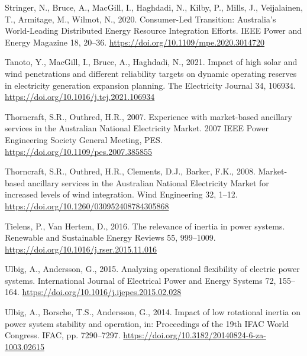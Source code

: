\documentclass[12pt,a4paper,]{report}
\newlength{\cslhangindent}
\newenvironment{CSLReferences}[2] %
 {%
  \setlength{\parindent}{0pt}
  \ifodd #1 \everypar{\setlength{\hangindent}{\cslhangindent}}\ignorespaces\fi
  \ifnum #2 > 0
  \setlength{\parskip}{#2\baselineskip}
  \fi
 }%
 {}
\begin{document}
\begin{CSLReferences}{1}{0}
\leavevmode{}%
Stringer, N., Bruce, A., MacGill, I., Haghdadi, N., Kilby, P., Mills,
J., Veijalainen, T., Armitage, M., Wilmot, N., 2020. Consumer-{Led
Transition}: {Australia}'s {World-Leading Distributed Energy Resource
Integration Efforts}. IEEE Power and Energy Magazine 18, 20--36.
\url{https://doi.org/10.1109/mpe.2020.3014720}

\leavevmode{}%
Tanoto, Y., MacGill, I., Bruce, A., Haghdadi, N., 2021. Impact of high
solar and wind penetrations and different reliability targets on dynamic
operating reserves in electricity generation expansion planning. The
Electricity Journal 34, 106934.
\url{https://doi.org/10.1016/j.tej.2021.106934}

\leavevmode{}%
Thorncraft, S.R., Outhred, H.R., 2007. Experience with market-based
ancillary services in the {Australian National Electricity Market}. 2007
IEEE Power Engineering Society General Meeting, PES.
\url{https://doi.org/10.1109/pes.2007.385855}

\leavevmode{}%
Thorncraft, S.R., Outhred, H.R., Clements, D.J., Barker, F.K., 2008.
Market-based ancillary services in the {Australian National Electricity
Market} for increased levels of wind integration. Wind Engineering 32,
1--12. \url{https://doi.org/10.1260/030952408784305868}

\leavevmode{}%
Tielens, P., Van Hertem, D., 2016. The relevance of inertia in power
systems. Renewable and Sustainable Energy Reviews 55, 999--1009.
\url{https://doi.org/10.1016/j.rser.2015.11.016}

\leavevmode{}%
Ulbig, A., Andersson, G., 2015. Analyzing operational flexibility of
electric power systems. International Journal of Electrical Power and
Energy Systems 72, 155--164.
\url{https://doi.org/10.1016/j.ijepes.2015.02.028}

\leavevmode{}%
Ulbig, A., Borsche, T.S., Andersson, G., 2014. Impact of low rotational
inertia on power system stability and operation, in: Proceedings of the
19th {IFAC World Congress}. {IFAC}, pp. 7290--7297.
\url{https://doi.org/10.3182/20140824-6-za-1003.02615}


\end{CSLReferences}
\end{document}
